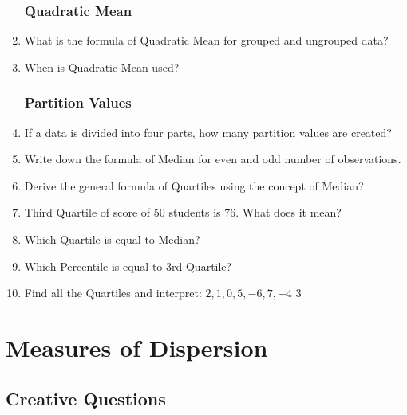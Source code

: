 \documentclass[a4paper,oneside]{book}
\begin{document}
\begin{enumerate}
\subsection{Quadratic Mean}

    \item What is the formula of Quadratic Mean for grouped and ungrouped data?
    \item When is Quadratic Mean used?

\subsection{Partition Values}
    \item If a data is divided into four parts, how many partition values are created?
    \item Write down the formula of Median for even and odd number of observations.
    \item Derive the general formula of Quartiles using the concept of Median?
    \item Third Quartile of score of 50 students is 76. What does it mean?
    \item Which Quartile is equal to Median?
    \item Which Percentile is equal to 3rd Quartile?
    \item Find all the Quartiles and interpret: $2,1,0,5,-6,7,-4$ \hfill 3

    
\end{enumerate}

\chapter{Measures of Dispersion} 
\section{Creative Questions}
\end{document}
